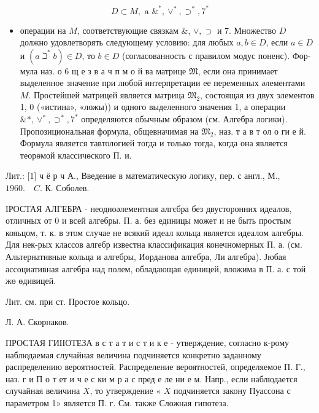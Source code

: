 \documentclass[10pt]{article}
\begin{document}
\[

D \subset M, \text { a } \&^{*}, \vee^{*}, \supset^{*}, 7^{*}

\]



\begin{itemize}

  \item операции на $M$, соответствующие связкам \&, $\vee, \supset$ и 7. Множество $D$ должно удовлетворять следующему условию: для любых $a, b \in D$, если $a \in D$ и $\left(a \beth^{*} b\right) \in D$, то $b \in D$ (согласованность с правилом модус поненс). Фор- мула наз. о 6 щ е з в а ч п м о й ва матрице $\mathfrak{M}$, если она принимает выделенное значение при любой интерпретации ее переменных әлементами $M$. Простейшей матрицей является матрица $\mathfrak{M}_{2}$, состоящая из двух элементов 1, 0 («истина», «ложы)) и одного выделенного значения 1, а операции $\& *, \vee^{*}, \supset^{*}, 7^{*}$ определяются обычным образом (см. Алгебра логики). Пропозициональная формула, общевначимая на $\mathfrak{M}_{2}$, наз. т а в т ол о ги е й. Формула является тавтологией тогда и только тогда, когда она является теорөмой классичөского П. и.

\end{itemize}



Лит.: [1] ч ё р ч А., Введение в математическую логику, пер. с англ., М., $1960 . \quad C$. К. Соболев.



ІРОСТАЯ АЛГЕБРА - неодноәлементная алгєбра без двусторонних идеалов, отличных от 0 и всей алгебры. П. а. без единицы может и не быть простым кояьцом, т. к. в этом случае не всякий идеал кольца является идеалом алгебры. Для нек-рых классов алгебр известна классификация конечномерных П. а. (см. Альтернативные кольца и алгебры, Иорданова алгебра, Ли алгебра). Јюбая ассоциативная алгебра над полем, обладающая единицей, вложима в П. а. с той жө өдивицей.



Лит. см. при ст. Простое кольцо.



Л. А. Скорнаков.



ПРОСТАЯ ГИІІОТЕЗА в с т а т и с т и к е - утверждение, согласно к-рому наблюдаемая случайная величина подчиняется конкретно заданному распределению вероятностей. Распределение вероятностей, определяемое П. Г., наз. г и П о т ет и ч е с ки м р а с пред е ле ни е м. Напр., если наблюдается случайная величина $X$, то утверждение « $X$ подчиняется закону Пуассона с параметром 1» является П. г. См. также Сложная гипотеза.
\end{document}
